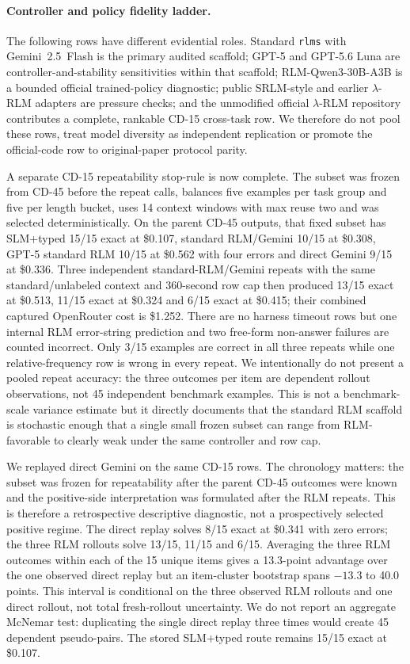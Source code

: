 \paragraph{Controller and policy fidelity ladder.}
The following rows have different evidential roles. Standard \texttt{rlms} with Gemini~2.5~Flash is the primary audited scaffold; GPT-5 and GPT-5.6 Luna are controller-and-stability sensitivities within that scaffold; RLM-Qwen3-30B-A3B is a bounded official trained-policy diagnostic; public SRLM-style and earlier $\lambda$-RLM adapters are pressure checks; and the unmodified official $\lambda$-RLM repository contributes a complete, rankable CD-15 cross-task row. We therefore do not pool these rows, treat model diversity as independent replication or promote the official-code row to original-paper protocol parity.

A separate CD-15 repeatability stop-rule is now complete. The subset was frozen from CD-45 before the repeat calls, balances five examples per task group and five per length bucket, uses 14 context windows with max reuse two and was selected deterministically. On the parent CD-45 outputs, that fixed subset has SLM+typed 15/15 exact at \$0.107, standard RLM/Gemini 10/15 at \$0.308, GPT-5 standard RLM 10/15 at \$0.562 with four errors and direct Gemini 9/15 at \$0.336. Three independent standard-RLM/Gemini repeats with the same standard/unlabeled context and 360-second row cap then produced 13/15 exact at \$0.513, 11/15 exact at \$0.324 and 6/15 exact at \$0.415; their combined captured OpenRouter cost is \$1.252. There are no harness timeout rows but one internal RLM error-string prediction and two free-form non-answer failures are counted incorrect. Only 3/15 examples are correct in all three repeats while one relative-frequency row is wrong in every repeat. We intentionally do not present a pooled repeat accuracy: the three outcomes per item are dependent rollout observations, not 45 independent benchmark examples. This is not a benchmark-scale variance estimate but it directly documents that the standard RLM scaffold is stochastic enough that a single small frozen subset can range from RLM-favorable to clearly weak under the same controller and row cap.

We replayed direct Gemini on the same CD-15 rows. The chronology matters: the subset was frozen for repeatability after the parent CD-45 outcomes were known and the positive-side interpretation was formulated after the RLM repeats. This is therefore a retrospective descriptive diagnostic, not a prospectively selected positive regime. The direct replay solves 8/15 exact at \$0.341 with zero errors; the three RLM rollouts solve 13/15, 11/15 and 6/15. Averaging the three RLM outcomes within each of the 15 unique items gives a 13.3-point advantage over the one observed direct replay but an item-cluster bootstrap spans $-13.3$ to 40.0 points. This interval is conditional on the three observed RLM rollouts and one direct rollout, not total fresh-rollout uncertainty. We do not report an aggregate McNemar test: duplicating the single direct replay three times would create 45 dependent pseudo-pairs. The stored SLM+typed route remains 15/15 exact at \$0.107.

